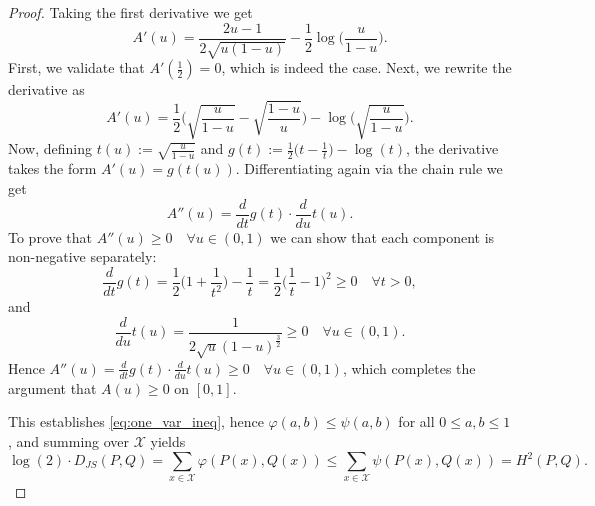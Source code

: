 \documentclass[10pt,a4paper]{amsart}
\begin{document}
\begin{proof}
Taking the first derivative we get
\[A'(u)=\frac{2u-1}{2\sqrt{u(1-u)}}-\frac{1}{2}\log \Big(\frac{u}{1-u} \Big).\]
First, we validate that $A'(\tfrac{1}{2})=0$, which is indeed the case. Next, we rewrite the derivative as
\[A'(u)=\frac{1}{2}\Bigg(\sqrt{\frac{u}{1-u}} - \sqrt{\frac{1-u}{u}} \Bigg) - \log \Bigg(\sqrt{\frac{u}{1-u}} \Bigg).\]
Now, defining $t(u) := \sqrt{\frac{u}{1-u}}$ and $g(t):= \frac{1}{2} \Big(t-\frac{1}{t} \Big) - \log(t)$, the derivative takes the form $A'(u)=g(t(u))$.
Differentiating again via the chain rule we get
\[A''(u)=\frac{d}{dt}g(t)\cdot \frac{d}{du}t(u).\]
To prove that $A''(u)\geq0 \quad \forall u \in (0,1)$ we can show that each component is non-negative separately:
\[\frac{d}{dt}g(t)=\frac{1}{2}\Big( 1 + \frac{1}{t^2} \Big) - \frac{1}{t}=\frac{1}{2}\Big( \frac{1}{t} - 1 \Big)^2 \geq 0 \quad \forall t > 0,\]
and
\[\frac{d}{du}t(u) = \frac{1}{2\sqrt{u}(1-u)^{\tfrac{3}{2}}} \geq 0 \quad \forall u\in(0,1).\]
Hence $A''(u)=\frac{d}{dt}g(t)\cdot \frac{d}{du}t(u) \geq0 \quad \forall u\in (0,1)$, which completes the argument that $A(u)\geq0$ on $[0,1]$.
 
This establishes \eqref{eq:one_var_ineq}, hence $\varphi(a,b)\leq\psi(a,b)$ for all $0\leq a,b\leq 1$, and summing over $\mathcal{X}$ yields
\begin{equation}
    \log(2) \cdot D_{JS}(P,Q) = \sum_{x\in\mathcal{X}} \varphi(P(x),Q(x)) \leq \sum_{x\in\mathcal{X}} \psi(P(x),Q(x)) = H^{2}(P,Q).
\label{eq:step3}
\end{equation}
\end{proof}
\end{document}
